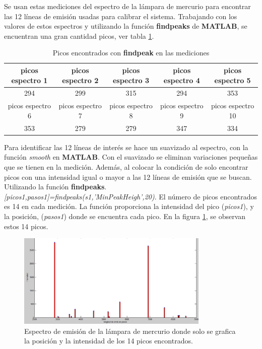 Se usan estas mediciones del espectro de la lámpara de mercurio para encontrar las 12 líneas de emisión usadas para calibrar el sistema.
Trabajando con los valores de estos espectros y utilizando la función \textbf{findpeaks} de \textbf{MATLAB}, se encuentran una gran cantidad  picos, ver tabla \ref{tabla:picos01}. 
\begin{table}[h]
	\centering
	\caption{Picos encontrados con \textbf{findpeak} en las mediciones}
	\label{tabla:picos01}
\begin{tabular}{|c|c|c|c|c|}
	\hline 
	picos espectro 1 & picos espectro 2 & picos espectro 3 & picos espectro 4 & picos espectro 5 \\ 
	\hline 
	294 & 299 & 315 & 294 & 353 \\ 
	\hline 
	picos espectro 6 & picos espectro 7 & picos espectro 8 & picos espectro 9 & picos espectro 10 \\ 
	\hline 
	353 & 279 & 279 & 347 & 334 \\ 
	\hline 
\end{tabular} 

\end{table}

Para identificar las 12 líneas de interés se hace un suavizado al espectro, con la función \textit{smooth} en \textbf{MATLAB}. Con el suavizado se eliminan variaciones pequeñas que se tienen en la medición. Además, al colocar la condición de solo encontrar picos con una intensidad igual o mayor a las 12 líneas de emisión que se buscan. Utilizando la función \textbf{findpeaks}. \textit{[picos1,pasos1]=findpeaks(s1,'MinPeakHeigh',20)}. El número de picos encontrados es 14 en cada medición. La función proporciona la intensidad del pico (\textit{picos1}), y la posición, (\textit{pasos1}) donde se encuentra cada pico. 
En la figura \ref{fig:picos14}, se observan estos 14 picos.

\begin{figure}[h]
	\centering
	\includegraphics[width=0.9\linewidth, height=4.5cm]{Imagenes/3/picos14}
	
	\caption[Espectro de emisión de la lámpara de mercurio, espectro en intensidad contra pasos.]{Espectro de emisión de la lámpara de mercurio donde solo se grafica la posición y la intensidad de los 14 picos encontrados.}
	\label{fig:picos14}
\end{figure}

